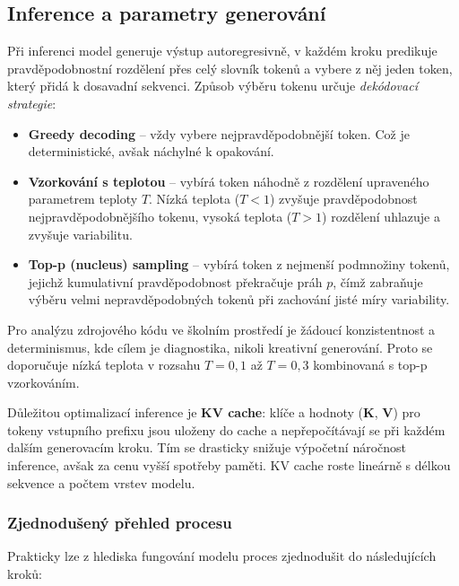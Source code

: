 \subsection{Inference a parametry generování}
\label{subsec:inference-generation}

Při inferenci model generuje výstup autoregresivně, v každém kroku predikuje pravděpodobnostní rozdělení přes celý slovník tokenů a vybere z něj jeden token, který přidá k dosavadní sekvenci.
Způsob výběru tokenu určuje \textit{dekódovací strategie}:

\begin{itemize}
    \item \textbf{Greedy decoding} -- vždy vybere nejpravděpodobnější token.
    Což je deterministické, avšak náchylné k opakování.

    \item \textbf{Vzorkování s teplotou} -- vybírá token náhodně z rozdělení upraveného parametrem teploty $T$.
    Nízká teplota ($T < 1$) zvyšuje pravděpodobnost nejpravděpodobnějšího tokenu, vysoká teplota ($T > 1$) rozdělení uhlazuje a zvyšuje variabilitu.

    \item \textbf{Top-p (nucleus) sampling} -- vybírá token z nejmenší podmnožiny tokenů, jejichž kumulativní pravděpodobnost překračuje práh $p$, čímž zabraňuje výběru velmi nepravděpodobných tokenů při zachování jisté míry variability.
\end{itemize}

Pro analýzu zdrojového kódu ve školním prostředí je žádoucí konzistentnost a determinismus, kde cílem je diagnostika, nikoli kreativní generování.
Proto se doporučuje nízká teplota v rozsahu $T = 0{,}1$ až $T = 0{,}3$ kombinovaná s top-p vzorkováním.

Důležitou optimalizací inference je \textbf{KV cache}: klíče a hodnoty ($\mathbf{K}$, $\mathbf{V}$) pro tokeny vstupního prefixu jsou uloženy do cache a nepřepočítávají se při každém dalším generovacím kroku.
Tím se drasticky snižuje výpočetní náročnost inference, avšak za cenu vyšší spotřeby paměti.
KV cache roste lineárně s délkou sekvence a počtem vrstev modelu.

\subsubsection*{Zjednodušený přehled procesu}
\label{subsubsec:llm-simplified-process}

Prakticky lze z hlediska fungování modelu proces zjednodušit do následujících kroků:

